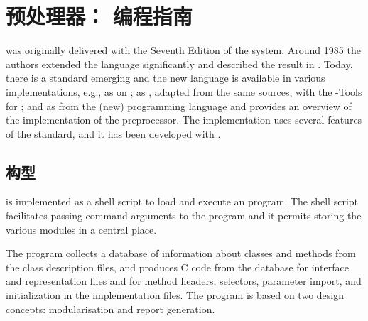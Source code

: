 

\chapter{ 预处理器： 编程指南}
 was originally delivered with the Seventh Edition of the
 system. Around 1985 the authors extended the language
significantly and described the result in \cite{AWK88}. Today, there is a
 standard emerging and the new language is available in various
implementations, e.g., as  on ; as ,
adapted from the same sources, with the -Tools for ;
and as  from the (new)  programming language and
provides an overview of the implementation of the  preprocessor.
The implementation uses several features of the  standard, and
it has been developed with .

\section{构型}%
 is implemented as a shell script to load and execute an
 program. The shell script facilitates passing 
command arguments to the  program and it permits storing the
various modules in a central place.

The  program collects a database of information about classes and
methods from the class description files, and produces C code from the
database for interface and representation files and for method headers,
selectors, parameter import, and initialization in the implementation files.
The  program is based on two design concepts: modularisation and
report generation.

